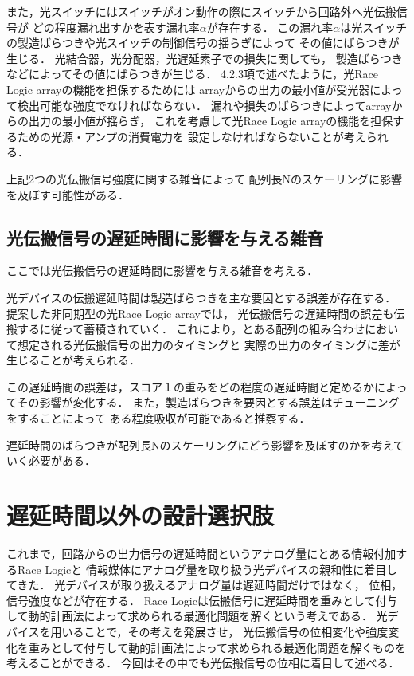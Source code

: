 また，光スイッチにはスイッチがオン動作の際にスイッチから回路外へ光伝搬信号が
どの程度漏れ出すかを表す漏れ率$\alpha$が存在する．
この漏れ率$\alpha$は光スイッチの製造ばらつきや光スイッチの制御信号の揺らぎによって
その値にばらつきが生じる．
光結合器，光分配器，光遅延素子での損失に関しても，
製造ばらつきなどによってその値にばらつきが生じる．
4.2.3項で述べたように，光Race Logic arrayの機能を担保するためには
arrayからの出力の最小値が受光器によって検出可能な強度でなければならない．
漏れや損失のばらつきによってarrayからの出力の最小値が揺らぎ，
これを考慮して光Race Logic arrayの機能を担保するための光源・アンプの消費電力を
設定しなければならないことが考えられる．

上記2つの光伝搬信号強度に関する雑音によって
配列長Nのスケーリングに影響を及ぼす可能性がある．

\subsection{光伝搬信号の遅延時間に影響を与える雑音}
ここでは光伝搬信号の遅延時間に影響を与える雑音を考える．

光デバイスの伝搬遅延時間は製造ばらつきを主な要因とする誤差が存在する．
提案した非同期型の光Race Logic arrayでは，
光伝搬信号の遅延時間の誤差も伝搬するに従って蓄積されていく．
これにより，とある配列の組み合わせにおいて想定される光伝搬信号の出力のタイミングと
実際の出力のタイミングに差が生じることが考えられる．

この遅延時間の誤差は，スコア１の重みをどの程度の遅延時間と定めるかによってその影響が変化する．
また，製造ばらつきを要因とする誤差はチューニングをすることによって
ある程度吸収が可能であると推察する．

遅延時間のばらつきが配列長Nのスケーリングにどう影響を及ぼすのかを考えていく必要がある．

\section{遅延時間以外の設計選択肢}
これまで，回路からの出力信号の遅延時間というアナログ量にとある情報付加するRace Logicと
情報媒体にアナログ量を取り扱う光デバイスの親和性に着目してきた．
光デバイスが取り扱えるアナログ量は遅延時間だけではなく，
位相，信号強度などが存在する．
Race Logicは伝搬信号に遅延時間を重みとして付与して動的計画法によって求められる最適化問題を解くという考えである．
光デバイスを用いることで，その考えを発展させ，
光伝搬信号の位相変化や強度変化を重みとして付与して動的計画法によって求められる最適化問題を解くものを
考えることができる．
今回はその中でも光伝搬信号の位相に着目して述べる．

